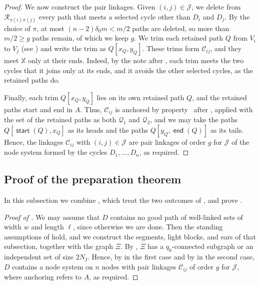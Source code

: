 \documentclass[fontsize=12pt,leading=14pt]{fullpaper}
\DeclareMathOperator{\st}{\mathsf{start}}
\DeclareMathOperator{\en}{\mathsf{end}}
\newcommand{\Ccal}{\mathcal{C}}
\newcommand{\Jcal}{\mathcal{J}}
\newcommand{\Qcal}{\mathcal{Q}}
\newcommand{\Rcal}{\mathcal{R}}
\newcommand{\XX}{\mathbb{X}}
\begin{document}
\begin{proof}
  We now construct the pair linkages.
  Given $(i,j)\in\Jcal$, we delete from $\Rcal_{\pi(i)\pi(j)}$ every path that meets a selected cycle other than $D_i$ and $D_j$.
  By the choice of $\pi$, at most $(n-2)\delta_0m<m/2$ paths are deleted, so more than $m/2\ge g$ paths remain, of which we keep $g$.
  We trim each retained path $Q$ from $V_i$ to $V_j$ (see ) and write the trim as $Q[x_Q,y_Q]$.
  These trims form $\Ccal_{ij}$, and they meet $\XX$ only at their ends.
  Indeed, by the note after , each trim meets the two cycles that it joins only at its ends, and it avoids the other selected cycles, as the retained paths do.

  Finally, each trim $Q[x_Q,y_Q]$ lies on its own retained path $Q$, and the retained paths start and end in $A$.
  Thus, $\Ccal_{ij}$ is anchored by property~ after , applied with the set of the retained paths as both $\Qcal_1$ and $\Qcal_2$, and we may take the paths $Q[\st(Q),x_Q]$ as its heads and the paths $Q[y_Q,\en(Q)]$ as its tails.
  Hence, the linkages $\Ccal_{ij}$ with $(i,j)\in\Jcal$ are pair linkages of order $g$ for $\Jcal$ of the node system formed by the cycles $D_1,\dots,D_n$, as required.
\end{proof}

\subsection{Proof of the preparation theorem}\label{sec:prep-proof}

In this subsection we combine , which treat the two outcomes of , and prove .

\begin{proof}[Proof of ]
  We may assume that $D$ contains no good path of well-linked sets of width $w$ and length $\ell$, since otherwise we are done.
  Then the standing assumptions of  hold, and we construct the segments, light blocks, and ears of that subsection, together with the graph $\Xi$.
  By , $\Xi$ has a $q_0$-connected subgraph or an independent set of size $2N_I$.
  Hence, by  in the first case and by  in the second case, $D$ contains a node system on $n$ nodes with pair linkages $\Ccal_{ij}$ of order $g$ for $\Jcal$, where anchoring refers to $A$, as required.
\end{proof}
\end{document}
